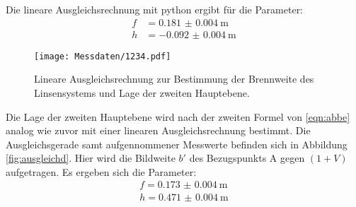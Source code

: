 Die lineare Ausgleichsrechnung mit python ergibt für die Parameter:
\begin{align}
	f &= \SI{0.181(4)}{\meter} \\
	h &= -\SI{0.092(4)}{\meter}
\end{align}

\begin{figure}
  \centering
  \texttt{[image: Messdaten/1234.pdf]}
  \caption{Lineare Ausgleichsrechnung zur Bestimmung der Brennweite des Linsensystems und Lage der zweiten Hauptebene.}
  \label{fig:ausgleichd2}
\end{figure}



Die Lage der zweiten Hauptebene wird nach der zweiten Formel von \eqref{eqn:abbe} analog wie
zuvor mit einer linearen Ausgleichsrechnung bestimmt.
Die Ausgleichsgerade samt aufgennommener Messwerte befinden sich in Abbildung \ref{fig:ausgleichd}. Hier wird die Bildweite $b'$ des Bezugspunkts A gegen $(1+V)$ aufgetragen.
Es ergeben sich die Parameter:
\begin{align}
	f = \SI{0.173(4)}{\meter}   \\
	h = \SI{0.471(4)}{\meter}
\end{align}
